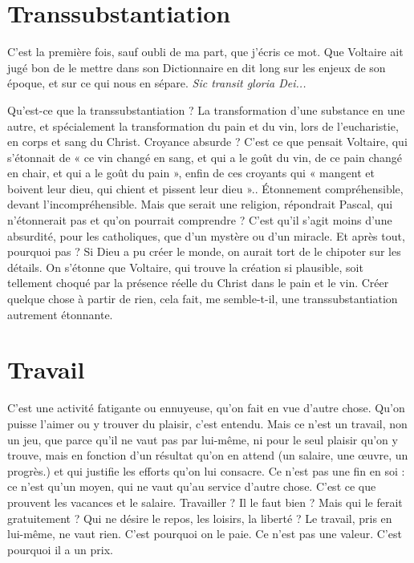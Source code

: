 \section{Transsubstantiation}
C'est la première fois, sauf oubli de ma part,
que j'écris ce mot. Que Voltaire ait jugé bon
de le mettre dans son Dictionnaire en dit long sur les enjeux de son époque, et
sur ce qui nous en sépare. {\it Sic transit gloria Dei...}

Qu'est-ce que la transsubstantiation ? La transformation d’une substance
en une autre, et spécialement la transformation du pain et du vin, lors de
l'eucharistie, en corps et sang du Christ. Croyance absurde ? C’est ce que pensait
Voltaire, qui s’étonnait de « ce vin changé en sang, et qui a le goût du vin,
de ce pain changé en chair, et qui a le goût du pain », enfin de ces croyants qui
« mangent et boivent leur dieu, qui chient et pissent leur dieu ».. Étonnement
compréhensible, devant l’incompréhensible. Mais que serait une religion,
répondrait Pascal, qui n’étonnerait pas et qu’on pourrait comprendre ? C’est
qu'il s’agit moins d’une absurdité, pour les catholiques, que d’un mystère ou
d’un miracle. Et après tout, pourquoi pas ? Si Dieu a pu créer le monde, on
aurait tort de le chipoter sur les détails. On s’étonne que Voltaire, qui trouve la
création si plausible, soit tellement choqué par la présence réelle du Christ dans
le pain et le vin. Créer quelque chose à partir de rien, cela fait, me semble-t-il,
une transsubstantiation autrement étonnante.

\section{Travail}
C’est une activité fatigante ou ennuyeuse, qu’on fait en vue d’autre
chose. Qu’on puisse l’aimer ou y trouver du plaisir, c’est entendu.
Mais ce n’est un travail, non un jeu, que parce qu’il ne vaut pas par lui-même,
ni pour le seul plaisir qu’on y trouve, mais en fonction d’un résultat qu’on en
attend (un salaire, une œuvre, un progrès.) et qui justifie les efforts qu’on lui
consacre. Ce n’est pas une fin en soi : ce n’est qu’un moyen, qui ne vaut qu’au
service d’autre chose. C’est ce que prouvent les vacances et le salaire.
Travailler ? Il le faut bien ? Mais qui le ferait gratuitement ? Qui ne désire le
repos, les loisirs, la liberté ? Le travail, pris en lui-même, ne vaut rien. C’est
pourquoi on le paie. Ce n’est pas une valeur. C’est pourquoi il a un prix.

